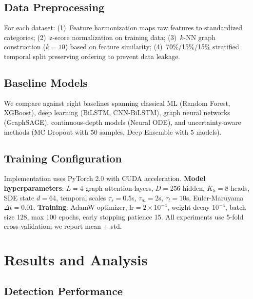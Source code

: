 \documentclass[10pt,journal,compsoc]{IEEEtran}
\begin{document}
\vspace{-0.2cm}
\subsection{Data Preprocessing}

For each dataset: (1)~Feature harmonization maps raw features to standardized categories; (2)~z-score normalization on training data; (3)~$k$-NN graph construction ($k=10$) based on feature similarity; (4)~70\%/15\%/15\% stratified temporal split preserving ordering to prevent data leakage.

\vspace{-0.2cm}
\subsection{Baseline Models}

We compare against eight baselines spanning classical ML (Random Forest, XGBoost), deep learning (BiLSTM, CNN-BiLSTM), graph neural networks (GraphSAGE), continuous-depth models (Neural ODE), and uncertainty-aware methods (MC Dropout with 50 samples, Deep Ensemble with 5 models).

\vspace{-0.2cm}
\subsection{Training Configuration}

Implementation uses PyTorch 2.0 with CUDA acceleration. \textbf{Model hyperparameters}: $L=4$ graph attention layers, $D=256$ hidden, $K_h=8$ heads, SDE state $d=64$, temporal scales $\tau_s{=}0.5$s, $\tau_m{=}2$s, $\tau_l{=}10$s, Euler-Maruyama $\Delta t{=}0.01$. \textbf{Training}: AdamW optimizer, lr$=2\times10^{-4}$, weight decay $10^{-4}$, batch size 128, max 100 epochs, early stopping patience 15. All experiments use 5-fold cross-validation; we report mean $\pm$ std.

\vspace{-0.2cm}
\section{Results and Analysis}
\label{sec:results}

\vspace{-0.2cm}
\subsection{Detection Performance}
\end{document}
